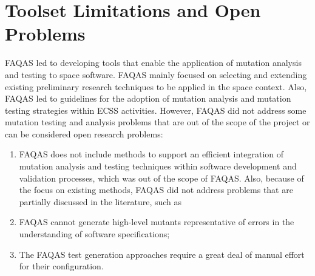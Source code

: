 \STARTCHANGEDWPT

\section{Toolset Limitations and Open Problems}
\label{sec:limitations}

FAQAS led to developing tools that enable the application of mutation analysis and testing to space software. FAQAS mainly focused on selecting and extending existing preliminary research techniques to be applied in the space context. Also, FAQAS led to guidelines for the adoption of mutation analysis and mutation testing strategies within ECSS activities. However, FAQAS did not address some mutation testing and analysis problems that are out of the scope of the project or can be considered open research problems:
\begin{enumerate}
\item FAQAS does not include methods to support an efficient integration of mutation analysis and testing techniques within software development and validation processes, which was out of the scope of FAQAS. Also, because of the focus on existing methods, FAQAS did not address problems that are partially discussed in the literature, such as
\item FAQAS cannot generate high-level mutants representative of errors in the understanding of software specifications;
\item The FAQAS test generation approaches require a great deal of manual effort for their configuration.
\end{enumerate}

